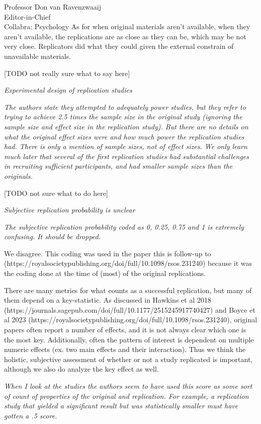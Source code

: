 \documentclass{stanfordletter}
\newcommand{\theysaid}[1]{\begin{leftbar} \noindent 
		\textsl{ #1}\end{leftbar}}
\begin{document}
\begin{letter}{Professor Don van Ravenzwaaij \\ Editor-in-Chief \\ Collabra: Psychology }
		As for when original materials aren't available, when they aren't available, the replications are as close as they can be, which may be not very close. Replicators did what they could given the external constrain of unavailable materials. 
		
		[TODO not really sure what to say here]
		
		\theysaid{Experimental design of replication studies}
		\theysaid{The authors state they attempted to adequately power studies, but they refer to trying to achieve 2.5 times the sample size in the original study (ignoring the sample size and effect size in the replication study). But there are no details on what the original effect sizes were and how much power the replication studies had. There is only a mention of sample sizes, not of effect sizes. We only learn much later that several of the first replication studies had substantial challenges in recruiting sufficient participants, and had smaller sample sizes than the originals.}
		
		[TODO not sure what to do here]
		
		\theysaid{Subjective replication probability is unclear}
		\theysaid{The subjective replication probability coded as 0, 0.25, 0.75 and 1 is extremely confusing. It should be dropped.}
		
		We disagree. This coding was used in the paper this is follow-up to (https://royalsocietypublishing.org/doi/full/10.1098/rsos.231240) because it was the coding done at the time of (most) of the original replications. 
		
		There are many metrics for what counts as a successful replication, but many of them depend on a key-statistic. As discussed in Hawkins et al 2018 (https://journals.sagepub.com/doi/full/10.1177/2515245917740427) and Boyce et al 2023 (https://royalsocietypublishing.org/doi/full/10.1098/rsos.231240), original papers often report a number of effects, and it is not always clear which one is the most key. Additionally, often the pattern of interest is dependent on multiple numeric effects (ex. two main effects and their interaction). Thus we think the holistic, subjective assessment of whether or not a study replicated is important, although we also do analyze the key effect as well. 
		
		\theysaid{ When I look at the studies the authors seem to have used this score as some sort of count of properties of the original and replication. For example, a replication study that yielded a significant result but was statistically smaller must have gotten a .5 score. }
		

\end{letter}
\end{document}
